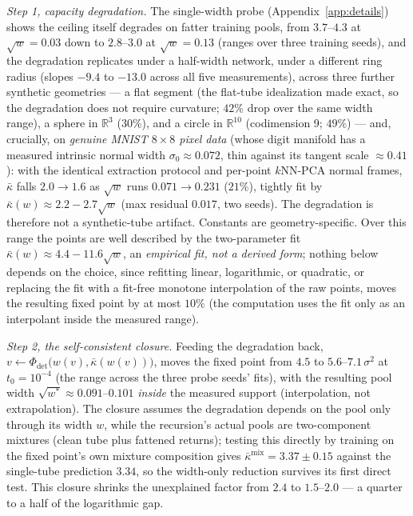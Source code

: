 \documentclass[11pt]{article}
\theoremstyle{remark}
\newcommand{\kb}{\bar\kappa}
\newcommand{\R}{\mathbb{R}}
\newcommand{\Phidet}{\Phi_{\mathrm{det}}}
\newcommand{\sigsq}{\sigma^2}
\begin{document}
\emph{Step 1, capacity degradation.} The single-width probe
(Appendix~\ref{app:details}) shows the ceiling itself degrades on fatter training pools,
from $3.7$--$4.3$ at $\sqrt w=0.03$ down to $2.8$--$3.0$ at $\sqrt w=0.13$ (ranges over
three training seeds), and the degradation replicates under a half-width network, under a
different ring radius (slopes $-9.4$ to $-13.0$ across all five measurements), across
three further synthetic geometries --- a flat segment (the flat-tube idealization made
exact, so the degradation does not require curvature; $42\%$ drop over the same width
range), a sphere in $\R^3$ ($30\%$), and a circle in $\R^{10}$ (codimension 9; $49\%$)
--- and, crucially, on \emph{genuine MNIST $8\times8$ pixel data} (whose digit manifold
has a measured intrinsic normal width $\sigma_0\approx0.072$, thin against its tangent
scale $\approx0.41$): with the identical extraction protocol and per-point $k$NN-PCA
normal frames, $\kb$ falls $2.0\to1.6$ as $\sqrt w$ runs $0.071\to0.231$ ($21\%$),
tightly fit by $\kb(w)\approx2.2-2.7\sqrt w$ (max residual $0.017$, two seeds). The
degradation is therefore not a synthetic-tube artifact. Constants are
geometry-specific. Over this range the points are well described by the
two-parameter fit $\kb(w)\approx4.4-11.6\sqrt{w}$, an \emph{empirical fit, not a derived
form}; nothing below depends on the choice, since refitting linear, logarithmic, or
quadratic, or replacing the fit with a fit-free monotone interpolation of the raw points,
moves the resulting fixed point by at most $10\%$ (the computation uses the fit only as an
interpolant inside the measured range).

\emph{Step 2, the self-consistent closure.} Feeding the degradation back,
$v\leftarrow\Phidet\big(w(v),\kb(w(v))\big)$, moves the fixed point from $4.5$ to
$5.6$--$7.1\,\sigsq$ at $t_0=10^{-4}$ (the range across the three probe seeds' fits), with
the resulting pool width $\sqrt{w^*}\approx0.091$--$0.101$ \emph{inside} the measured
support (interpolation, not extrapolation). The closure assumes the degradation depends on
the pool only through its width $w$, while the recursion's actual pools are two-component
mixtures (clean tube plus fattened returns); testing this directly by training on the fixed
point's own mixture composition gives $\kb^{\mathrm{mix}}=3.37\pm0.15$ against the
single-tube prediction $3.34$, so the width-only reduction survives its first direct test.
This closure shrinks the unexplained factor from $2.4$ to $1.5$--$2.0$ --- a quarter to a
half of the logarithmic gap.
\end{document}
